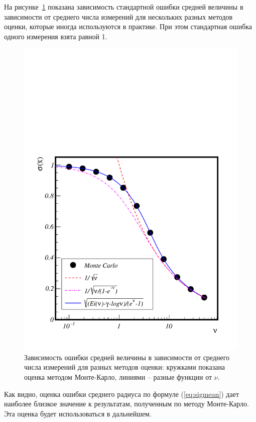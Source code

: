 \documentclass[12pt]{article}
\begin{document}
На рисунке~\ref{fig:sigmean} показана зависимость стандартной ошибки средней величины в зависимости от среднего числа измерений для нескольких разных
методов оценки, которые иногда используются в практике. При этом стандартная ошибка одного измерения взята равной 1.
\begin{figure}[hp]
\begin{center}
\includegraphics[width=0.6\textheight]{sigmean.pdf}
\caption{\small Зависимость ошибки средней величины в зависимости от среднего числа измерений для разных методов оценки: кружками показана оценка 
методом Монте-Карло, линиями -- разные функции от $\nu$.}
\label{fig:sigmean}
\end{center}
\end{figure}

Как видно, оценка ошибки среднего радиуса по формуле (\ref{eq:sigmean}) дает наиболее близкое значение к результатам, полученным по методу Монте-Карло. 
Эта оценка будет использоваться в дальнейшем.
\end{document}
